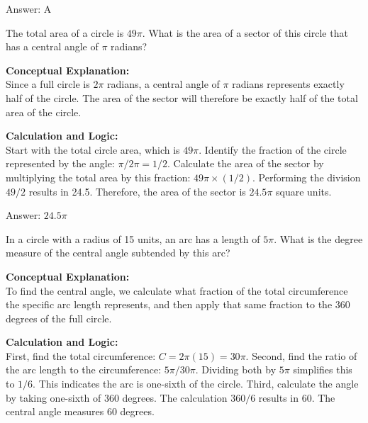 \documentclass[11pt,paper=a4,answers]{exam}
\begin{document}
\begin{questions}
\begin{solution}
\vspace{30pt}

Answer: \colorbox{yellow!100}{A}
\end{solution}

\vspace{60pt}

\question
The total area of a circle is $49\pi$. What is the area of a sector of this circle that has a central angle of $\pi$ radians?

\begin{solution}
\textbf{Conceptual Explanation:} \\
Since a full circle is $2\pi$ radians, a central angle of $\pi$ radians represents exactly half of the circle. The area of the sector will therefore be exactly half of the total area of the circle.

\vspace{30pt}

\textbf{Calculation and Logic:} \\
Start with the total circle area, which is $49\pi$. Identify the fraction of the circle represented by the angle: $\pi / 2\pi = 1 / 2$. Calculate the area of the sector by multiplying the total area by this fraction: $49\pi \times (1 / 2)$. Performing the division $49 / 2$ results in 24.5. Therefore, the area of the sector is $24.5\pi$ square units.

\vspace{30pt}

Answer: \colorbox{yellow!100}{$24.5\pi$}
\end{solution}

\vspace{60pt}

\question
In a circle with a radius of 15 units, an arc has a length of $5\pi$. What is the degree measure of the central angle subtended by this arc?

\begin{solution}
\textbf{Conceptual Explanation:} \\
To find the central angle, we calculate what fraction of the total circumference the specific arc length represents, and then apply that same fraction to the 360 degrees of the full circle.

\vspace{30pt}

\textbf{Calculation and Logic:} \\
First, find the total circumference: $C = 2\pi(15) = 30\pi$. Second, find the ratio of the arc length to the circumference: $5\pi / 30\pi$. Dividing both by $5\pi$ simplifies this to $1 / 6$. This indicates the arc is one-sixth of the circle. Third, calculate the angle by taking one-sixth of 360 degrees. The calculation $360 / 6$ results in 60. The central angle measures 60 degrees.


\end{solution}
\end{questions}
\end{document}
